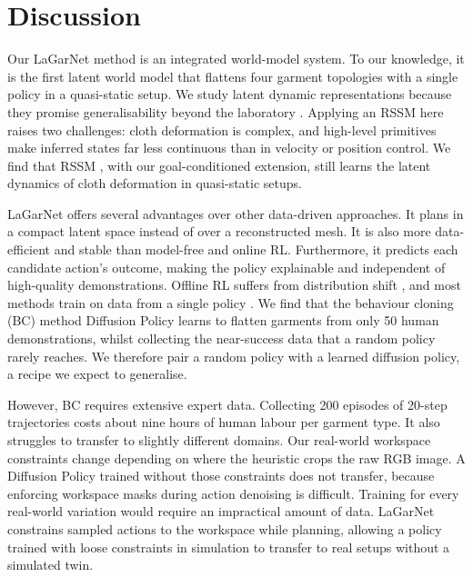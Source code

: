 \documentclass[journal]{IEEEtran}
\newif\ifshowrev\showrevtrue
\newcommand{\rev}[1]{\ifshowrev\textcolor{revblue}{#1}\else#1\fi}
\newif\ifshowrrev\showrrevtrue
\newcommand{\rrev}[1]{\ifshowrrev\textcolor{rrevred}{#1}\else#1\fi}
\begin{document}
\section{Discussion} \label{sec:discussion}

\rev{Our LaGarNet method is an integrated world-model system. \rrev{To our knowledge,} it is the first latent world model that flattens four garment topologies with a single policy in a quasi-static setup. We study latent dynamic representations because they promise generalisability beyond the laboratory \cite{ha2018world}. Applying an RSSM here raises two challenges: cloth deformation is complex, and high-level primitives make inferred states far less continuous than in velocity or position control. We find that RSSM \cite{hafner2019learning}, with our goal-conditioned extension, still learns the latent dynamics of cloth deformation in quasi-static setups.}

\rev{LaGarNet offers several advantages over other data-driven approaches. It plans in a compact latent space instead of over a reconstructed mesh. It is also more data-efficient and stable than model-free and online RL. Furthermore, it predicts each candidate action's outcome, making the policy explainable and independent of high-quality demonstrations. Offline RL suffers from distribution shift \cite{prudencio2023survey}, and most methods train on data from a single policy \cite{agarwal2020optimistic}. We find that the behaviour cloning (BC) method Diffusion Policy \cite{chi2023diffusionpolicy} learns to flatten garments from only 50 human demonstrations, whilst collecting the near-success data that a random policy rarely reaches. We therefore pair a random policy with a learned diffusion policy, a recipe we expect to generalise.}

\rev{However, BC requires extensive expert data. Collecting 200 episodes of 20-step trajectories costs about nine hours of human labour per garment type. It also struggles to transfer to slightly different domains. Our real-world workspace constraints change depending on where the heuristic crops the raw RGB image. A Diffusion Policy trained without those constraints does not transfer, because enforcing workspace masks during action denoising is difficult. Training for every real-world variation would require an impractical amount of data. LaGarNet constrains sampled actions to the workspace while planning, allowing a policy trained with loose constraints in simulation to transfer to real setups without a simulated twin.}
\end{document}
